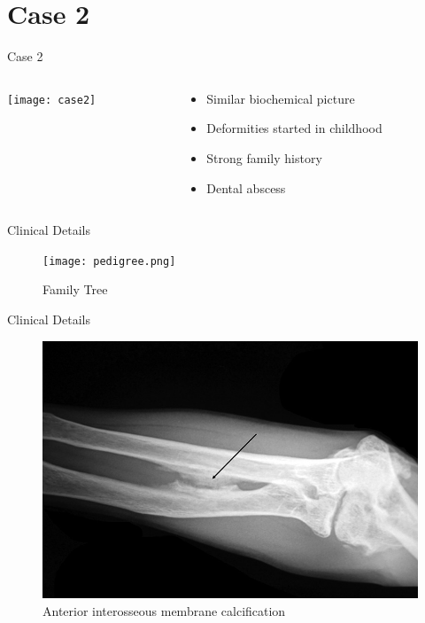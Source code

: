 \documentclass[compress]{beamer}
\begin{document}
\section{Case 2} 
\begin{frame}{Case 2  }
	\begin{columns}
		\begin{column}{0.5\textwidth}
			\texttt{[image: case2]}
		\end{column}
		
		\begin{column}{0.5\textwidth}
			\begin{itemize}
				\item Similar biochemical picture
				\item Deformities started in childhood
				\item Strong family history
				\item Dental abscess
			\end{itemize}
		\end{column}
	\end{columns}
	
\end{frame} 
\begin{frame}{Clinical Details  }
	\begin{figure}
		\centering
		\texttt{[image: pedigree.png]}
		\caption{Family Tree}
	\end{figure}
	
\end{frame} 
\begin{frame}{Clinical Details   }
	\begin{figure}
		\centering
		\includegraphics[width=0.7\linewidth]{osteomalacia/iom}
		\caption{Anterior interosseous membrane calcification}
		\label{fig:iom}
	\end{figure}
	
\end{frame}  
\end{document}
